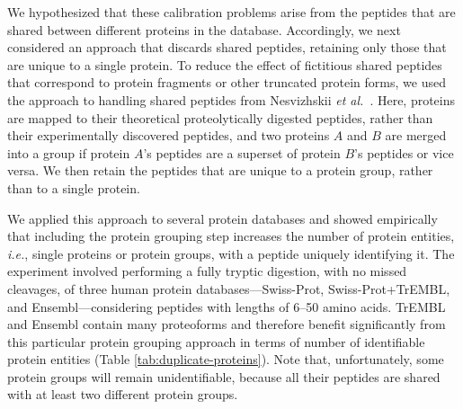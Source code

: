 \documentclass{article}
\begin{document}
We hypothesized that these calibration problems arise from the
peptides that are shared between different proteins in the database.
Accordingly, we next considered an approach that discards shared
peptides, retaining only those that are unique to a single protein.
To reduce the effect of fictitious shared peptides that correspond to
protein fragments or other truncated protein forms, we used the
approach to handling shared peptides from Nesvizhskii {\em et
  al.}~\cite{nesvizhskii2003statistical}. Here, proteins are mapped to
their theoretical proteolytically digested peptides, rather than their
experimentally discovered peptides, and two proteins $A$ and $B$ are
merged into a group if protein $A$'s peptides are a superset of
protein $B$'s peptides or vice versa.  We then retain the peptides
that are unique to a protein group, rather than to a single protein.

We applied this approach to several protein databases and showed
empirically that including the protein grouping step increases the
number of protein entities, {\em i.e.}, single proteins or protein
groups, with a peptide uniquely identifying it. The experiment
involved performing a fully tryptic digestion, with no missed
cleavages, of three human protein databases---Swiss-Prot,
Swiss-Prot+TrEMBL, and Ensembl---considering peptides with lengths of
6--50 amino acids. TrEMBL and Ensembl contain many proteoforms and
therefore benefit significantly from this particular protein grouping
approach in terms of number of identifiable protein entities (Table
\ref{tab:duplicate-proteins}). Note that, unfortunately, some protein
groups will remain unidentifiable, because all their peptides are
shared with at least two different protein groups.
\end{document}
